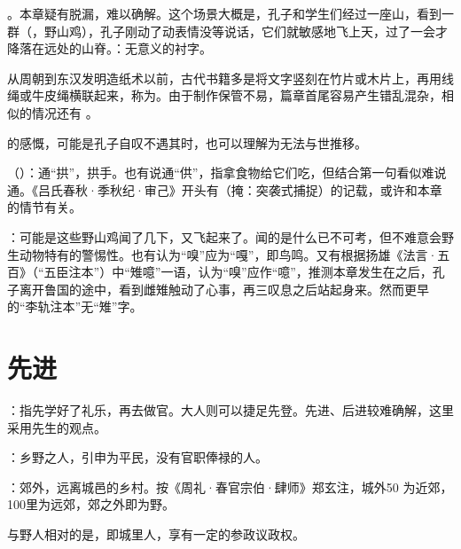 {
\item {}。本章疑有脱漏，难以确解。这个场景大概是，孔子和学生们经过一座山，看到一群（，野山鸡），孔子刚动了动表情没等说话，它们就敏感地飞上天，过了一会才降落在远处的山脊。：无意义的衬字。

从周朝到东汉发明造纸术以前，古代书籍多是将文字竖刻在竹片或木片上，再用线绳或牛皮绳横联起来，称为。由于制作保管不易，篇章首尾容易产生错乱混杂，相似的情况还有   。

\item {}的感慨，可能是孔子自叹不遇其时，也可以理解为无法与世推移。
\item {}（）：通“拱”，拱手。也有说通“供”，指拿食物给它们吃，但结合第一句看似难说通。《吕氏春秋·季秋纪·审己》开头有（掩：突袭式捕捉）的记载，或许和本章的情节有关。
\item {}：可能是这些野山鸡闻了几下，又飞起来了。闻的是什么已不可考，但不难意会野生动物特有的警惕性。也有认为“嗅”应为“嘎”，即鸟鸣。又有根据扬雄《法言·五百》（“五臣注本”）中“雉噫”一语，认为“嗅”应作“噫”，推测本章发生在之后，孔子离开鲁国的途中，看到雌雉触动了心事，再三叹息之后站起身来。然而更早的“李轨注本”无“雉”字。
}
{}



\chapter{先进}

{
\item {}：指先学好了礼乐，再去做官。大人则可以捷足先登。先进、后进较难确解，这里采用先生的观点。

\item {}：乡野之人，引申为平民，没有官职俸禄的人。

：郊外，远离城邑的乡村。按《周礼·春官宗伯·肆师》郑玄注，城外50 为近郊，100里为远郊，郊之外即为野。

与野人相对的是，即城里人，享有一定的参政议政权。
}
{}


